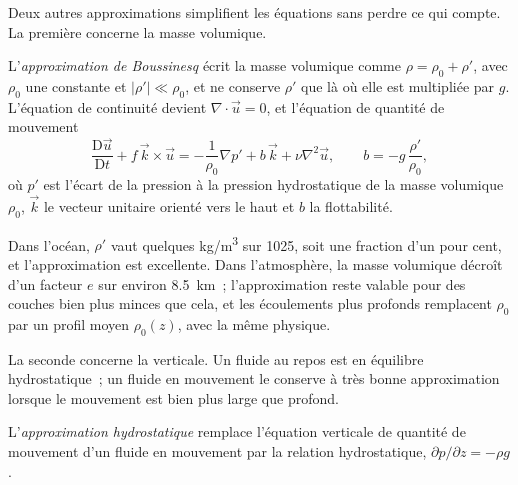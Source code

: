 \begin{omfigure}
\par{}\label{fig:b3:gfd-foundations:frame}
\end{omfigure}

Deux autres approximations simplifient les équations sans perdre ce qui
compte. La première concerne la masse volumique.

\begin{definition}\label{def:b3:gfd-foundations:boussinesq}
L'\emph{approximation de Boussinesq} écrit
la masse volumique comme $\rho = \rho_0 + \rho'$, avec $\rho_0$ une constante et
$|\rho'| \ll \rho_0$, et ne conserve $\rho'$ que là où elle est multipliée par $g$.
L'équation de continuité devient $\nabla\cdot\vec u = 0$, et l'équation de
quantité de mouvement
\[
\frac{\mathrm D\vec u}{\mathrm Dt} + f\,\vec k\times\vec u =
-\frac{1}{\rho_0}\nabla p' + b\,\vec k + \nu\nabla^2\vec u ,
\qquad b = -g\,\frac{\rho'}{\rho_0} ,
\]
où $p'$ est l'écart de la pression à la pression hydrostatique
de la masse volumique $\rho_0$, $\vec k$ le vecteur unitaire orienté vers le haut et $b$ la
flottabilité.
\end{definition}

Dans l'océan, $\rho'$ vaut quelques \unit{kg/m^3} sur \num{1025}, soit une fraction d'un
pour cent, et l'approximation est excellente. Dans l'atmosphère, la masse volumique
décroît d'un facteur $e$ sur environ \qty{8.5}{km}~; l'approximation reste valable pour
des couches bien plus minces que cela, et les écoulements plus profonds remplacent $\rho_0$ par un
profil moyen $\rho_0(z)$, avec la même physique.

La seconde concerne la verticale. Un fluide au repos est en
équilibre hydrostatique~; un fluide en mouvement le conserve à très bonne approximation lorsque
le mouvement est bien plus large que profond.

\begin{definition}\label{def:b3:gfd-foundations:hydrostatic}
L'\emph{approximation hydrostatique}
remplace l'équation verticale de quantité de mouvement d'un fluide en mouvement par la
relation hydrostatique, $\partial p/\partial z = -\rho g$.
\end{definition}

